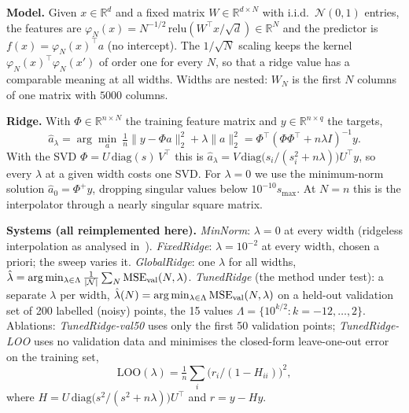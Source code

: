 \textbf{Model.} Given $x\in\mathbb R^d$ and a fixed matrix $W\in\mathbb R^{d\times N}$ with i.i.d.\ $\mathcal N(0,1)$ entries, the features are $\varphi_N(x)=N^{-1/2}\,\mathrm{relu}(W^\top x/\sqrt d)\in\mathbb R^N$ and the predictor is $f(x)=\varphi_N(x)^\top a$ (no intercept). The $1/\sqrt N$ scaling keeps the kernel $\varphi_N(x)^\top\varphi_N(x')$ of order one for every $N$, so that a ridge value has a comparable meaning at all widths. Widths are nested: $W_N$ is the first $N$ columns of one matrix with $5000$ columns.

\textbf{Ridge.} With $\Phi\in\mathbb R^{n\times N}$ the training feature matrix and $y\in\mathbb R^{n\times q}$ the targets,
\begin{equation}
\hat a_\lambda=\arg\min_a\ \tfrac1n\|y-\Phi a\|_2^2+\lambda\|a\|_2^2=\Phi^\top(\Phi\Phi^\top+n\lambda I)^{-1}y .
\end{equation}
With the SVD $\Phi=U\,\mathrm{diag}(s)\,V^\top$ this is $\hat a_\lambda=V\,\mathrm{diag}\!\big(s_i/(s_i^2+n\lambda)\big)U^\top y$, so every $\lambda$ at a given width costs one SVD. For $\lambda=0$ we use the minimum-norm solution $\hat a_0=\Phi^{+}y$, dropping singular values below $10^{-10}s_{\max}$. At $N=n$ this is the interpolator through a nearly singular square matrix.

\textbf{Systems (all reimplemented here).}
\emph{MinNorm}: $\lambda=0$ at every width (ridgeless interpolation as analysed in~\cite{hastie2019surprises}).
\emph{FixedRidge}: $\lambda=10^{-2}$ at every width, chosen a priori; the sweep varies it.
\emph{GlobalRidge}: one $\lambda$ for all widths, $\hat\lambda=\arg\min_{\lambda\in\Lambda}\frac1{|\mathcal N|}\sum_N \mathrm{MSE}_{\rm val}(N,\lambda)$.
\emph{TunedRidge} (the method under test): a separate $\lambda$ per width, $\hat\lambda(N)=\arg\min_{\lambda\in\Lambda}\mathrm{MSE}_{\rm val}(N,\lambda)$ on a held-out validation set of 200 labelled (noisy) points, the 15 values $\Lambda=\{10^{k/2}: k=-12,\dots,2\}$.
Ablations: \emph{TunedRidge-val50} uses only the first 50 validation points; \emph{TunedRidge-LOO} uses no validation data and minimises the closed-form leave-one-out error on the training set,
\begin{equation}
\mathrm{LOO}(\lambda)=\tfrac1n\textstyle\sum_i\big(r_i/(1-H_{ii})\big)^2,
\end{equation}
where $H=U\,\mathrm{diag}\big(s^2/(s^2+n\lambda)\big)U^\top$ and $r=y-Hy$.


